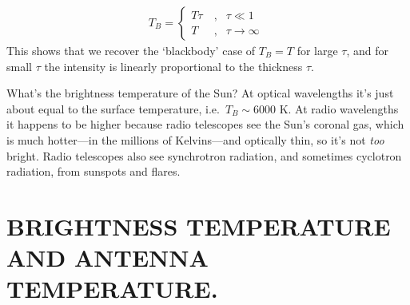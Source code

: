 \documentclass[12pt,psfig,preprint]{aastex}
\begin{document}
\begin{eqnarray} \label{tbeqn2}
T_B =\left\{
\begin{array}{lcl}
T \tau & \ , & \tau \ll 1 \\
T      & \ , & \tau \rightarrow \infty
\end{array}
\; \right.
\end{eqnarray}
%
This shows that we recover the `blackbody' case of $T_B=T$ for large
$\tau$, and for small $\tau$ the intensity is linearly proportional to
the thickness $\tau$. 

What's the brightness temperature of the Sun? At optical wavelengths
it's just about equal to the surface temperature, i.e.\ $T_B \sim 6000$
K. At radio wavelengths it happens to be higher because radio telescopes
see the Sun's coronal gas, which is much hotter---in the millions of
Kelvins---and optically thin, so it's not {\it too} bright. Radio
telescopes also see synchrotron radiation, and sometimes cyclotron
radiation, from sunspots and flares.

\section {BRIGHTNESS TEMPERATURE AND ANTENNA TEMPERATURE.}  \label{tbandta}
\end{document}
